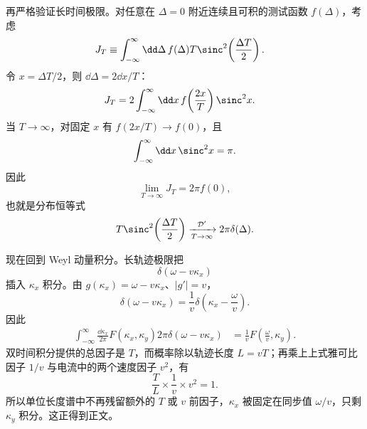 \begin{derivation}[平面界面的混合表象与单位长度损失]
再严格验证长时间极限。对任意在 $\Delta=0$ 附近连续且可积的测试函数 $f(\Delta)$，考虑
\begin{align*}
 J_T
 &\equiv\int_{-\infty}^{\infty}\dd\Delta\,
 f(\Delta)
 T\sinc^2\!\left(\frac{\Delta T}{2}\right).
\end{align*}
令 $x=\Delta T/2$，则 $\dd\Delta=2\dd x/T$：
\begin{align*}
 J_T
 &=2\int_{-\infty}^{\infty}\dd x\,
 f\!\left(\frac{2x}{T}\right)
 \sinc^2x.
\end{align*}
当 $T\to\infty$，对固定 $x$ 有 $f(2x/T)\to f(0)$，且
\begin{equation*}
 \int_{-\infty}^{\infty}\dd x\,\sinc^2x=\pi.
\end{equation*}
因此
\begin{equation*}
 \lim_{T\to\infty}J_T
 =2\pi f(0),
\end{equation*}
也就是分布恒等式
\begin{equation*}
 T\sinc^2\!\left(\frac{\Delta T}{2}\right)
 \xrightarrow[T\to\infty]{\mathcal D'}
 2\pi\delta(\Delta).
\end{equation*}

现在回到 Weyl 动量积分。长轨迹极限把
\begin{equation*}
 \delta(\omega-v\kappa_x)
\end{equation*}
插入 $\kappa_x$ 积分。由 $g(\kappa_x)=\omega-v\kappa_x$、$|g'|=v$，
\begin{equation*}
 \delta(\omega-v\kappa_x)
 =\frac1v
 \delta\!\left(\kappa_x-\frac\omega v\right).
\end{equation*}
因此
\begin{align*}
 \int_{-\infty}^{\infty}\frac{\dd\kappa_x}{2\pi}
 F(\kappa_x,\kappa_y)
 2\pi\delta(\omega-v\kappa_x)
 &=\frac1v
 F\!\left(\frac\omega v,\kappa_y\right).
\end{align*}
双时间积分提供的总因子是 $T$，而概率除以轨迹长度 $L=vT$；再乘上上式雅可比因子 $1/v$ 与电流中的两个速度因子 $v^2$，有
\begin{equation*}
 \frac{T}{L}\times\frac1v\times v^2
 =1.
\end{equation*}
所以单位长度谱中不再残留额外的 $T$ 或 $v$ 前因子，$\kappa_x$ 被固定在同步值 $\omega/v$，只剩 $\kappa_y$ 积分。这正得到正文。
\end{derivation}

